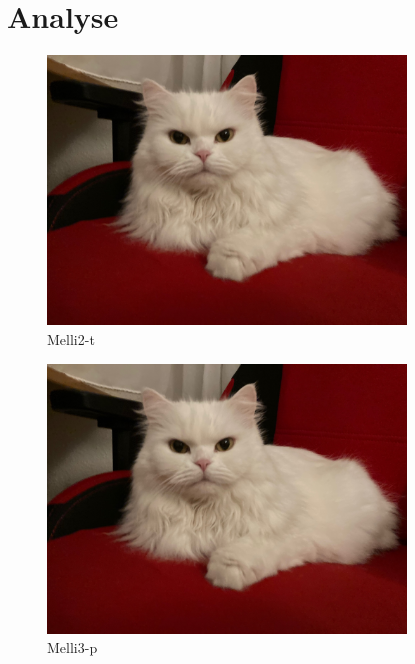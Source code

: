 \documentclass[12pt,ngerman,parskip=full]{scrreprt}
\begin{document}
\blindtext[2]

\blindtext[2]

\section{Analyse}

\blindtext[5]

\begin{figure}[t]\centering
\includegraphics[width=0.85\textwidth]{Images/Katze}
\caption{Melli2-t}
\end{figure}

\blindtext[3]

\blindtext[2]

\begin{figure}[p]\centering
\includegraphics[width=0.85\textwidth]{Images/Katze}
\caption{Melli3-p}
\end{figure}

\blindtext[3]
\end{document}
